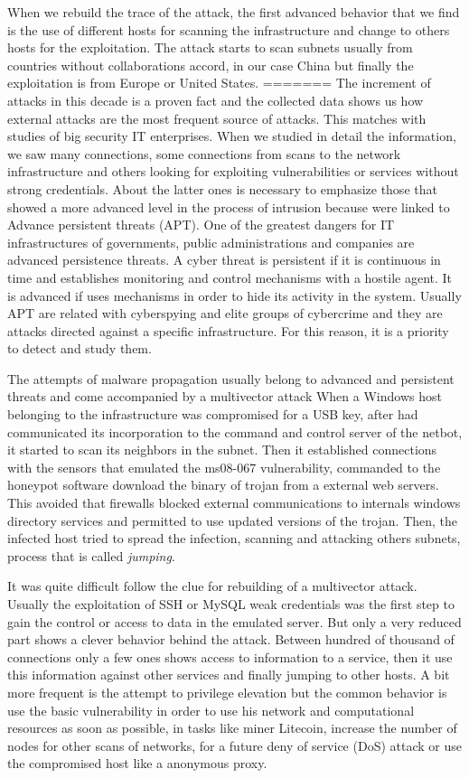\documentclass[a4paper]{llncs}
\begin{document}
When we rebuild the trace of the attack, the first advanced behavior that we find is the use of different hosts for scanning the infrastructure and change to others hosts for the exploitation. The attack starts to scan subnets usually from countries without collaborations accord, in our case China but finally the exploitation is from Europe or United States.%
=======
The increment of attacks in this decade is a proven fact and the collected data shows us how external attacks are the most frequent source of attacks. This matches with studies of big security IT enterprises\cite{verizon-2015}. When we studied in detail the information, we saw many connections, some connections from scans to the network infrastructure and others looking for exploiting vulnerabilities or services without strong credentials. About the latter ones is necessary to emphasize those that showed a more advanced level in the process of intrusion because were linked to Advance persistent threats (APT). One of the greatest dangers for IT infrastructures of governments, public administrations and companies are advanced persistence threats. A cyber threat is persistent if it is continuous in time and establishes monitoring and control mechanisms with a hostile agent. It is advanced if uses mechanisms in order to hide its activity in the system. Usually APT are related with cyberspying and elite groups of cybercrime and they are attacks directed against a specific infrastructure. For this reason, it is a priority to detect and study them.

The attempts of malware propagation usually belong to advanced and persistent threats and come accompanied by a multivector attack %
When a Windows host belonging to the infrastructure was compromised for a USB key, after had communicated its incorporation to the command and control server of the netbot, it started to scan its neighbors in the subnet. Then it established connections with the sensors that  emulated the ms08-067 %
vulnerability, commanded to the honeypot software download the binary of trojan from a external web servers. This avoided that firewalls blocked external communications to internals windows directory services and permitted to use updated versions of the trojan. Then, the infected host tried to spread the infection, scanning and attacking others subnets, process that is called {\it jumping}.

It was quite difficult follow the clue for rebuilding of a multivector attack. Usually the exploitation of SSH or MySQL weak credentials was the first step to gain the control or access to data in the emulated server. But only a very reduced part shows a clever behavior behind the attack. Between hundred of thousand of connections only a few ones shows access to information to a service, then it use this information against other services and finally jumping to other hosts. A bit more frequent is the attempt to privilege elevation but the common behavior is use the basic vulnerability in order to use his network and computational resources as soon as possible, in tasks like miner Litecoin\cite{litecoin}, increase the number of nodes for other scans of networks, for a future deny of service (DoS) attack or use the compromised host like a anonymous proxy.
\end{document}
